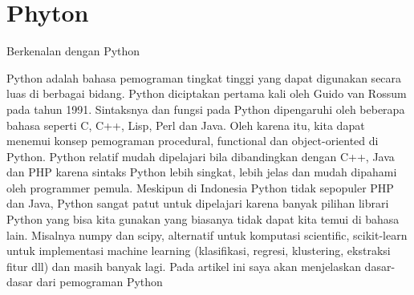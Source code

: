 
\section*{Phyton}

Berkenalan dengan Python

Python adalah bahasa pemograman tingkat tinggi yang dapat digunakan secara luas di berbagai bidang. Python diciptakan pertama kali oleh Guido van Rossum pada tahun 1991. Sintaksnya dan fungsi pada Python dipengaruhi oleh beberapa bahasa seperti C, C++, Lisp, Perl dan Java. Oleh karena itu, kita dapat menemui konsep pemograman procedural, functional dan object-oriented di Python. Python relatif mudah dipelajari bila dibandingkan dengan C++, Java dan PHP karena sintaks Python lebih singkat, lebih jelas dan mudah dipahami oleh programmer pemula.
Meskipun di Indonesia Python tidak sepopuler PHP dan Java, Python sangat patut untuk dipelajari karena banyak pilihan librari Python yang bisa kita gunakan yang biasanya tidak dapat kita temui di bahasa lain. Misalnya numpy dan scipy, alternatif untuk komputasi scientific, scikit-learn untuk implementasi machine learning (klasifikasi, regresi, klustering, ekstraksi fitur dll) dan masih banyak lagi. Pada artikel ini saya akan menjelaskan dasar-dasar dari pemograman Python



